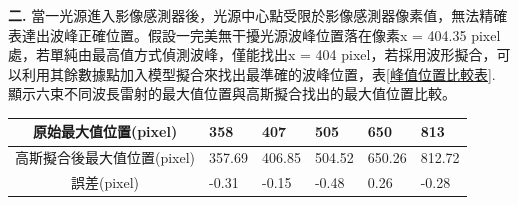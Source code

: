 \textbf{二.} 當一光源進入影像感測器後，光源中心點受限於影像感測器像素值，無法精確表達出波峰正確位置。假設一完美無干擾光源波峰位置落在像素x = 404.35 pixel處，若單純由最高值方式偵測波峰，僅能找出x = 404 pixel，若採用波形擬合，可以利用其餘數據點加入模型擬合來找出最準確的波峰位置，表\ref{峰值位置比較表}. 顯示六束不同波長雷射的最大值位置與高斯擬合找出的最大值位置比較。
\begin{center}
\vspace{0.8cm}
\label{峰值位置比較表}
\begin{tabularx}{\textwidth}{|c|m{1.5cm}<{\centering}|m{1.5cm}<{\centering}|m{1.5cm}<{\centering}|m{1.5cm}<{\centering}|m{1.41cm}<{\centering}|}
	\hline
	原始最大值位置(pixel)& 358 & 407 & 505 & 650 & 813\\
	\hline
	高斯擬合後最大值位置(pixel)& 357.69 & 406.85 & 504.52 & 650.26 & 812.72\\
	\hline
	誤差(pixel)&-0.31&-0.15&-0.48&0.26&-0.28\\
	\hline
\end{tabularx}
\vspace{10pt}
\end{center}

